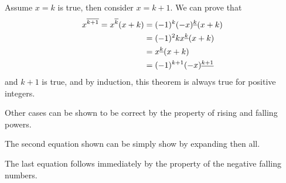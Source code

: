 Assume $x=k$ is true, then consider $x=k+1$. We can prove that
\begin{align*}
    x^{\overline{k+1}} = x^{\overline{k}} (x+k)&=(-1)^k(-x)^{\underline{k}} (x+k)\\
                               &=(-1)^2k x^{\underline{k}} (x+k) \\
                               &= x^{\underline{k}} (x+k) \\
                               &= (-1)^{k+1} (-x)^{\underline{k+1}}
\end{align*}
and $k+1$ is true, and by induction, this theorem is always true for 
positive integers. 

Other cases can be shown to be correct by the property of 
rising and falling powers. 

The second equation shown can be simply show by expanding then all. 

The last equation follows immediately by the property of the negative 
falling numbers. 


